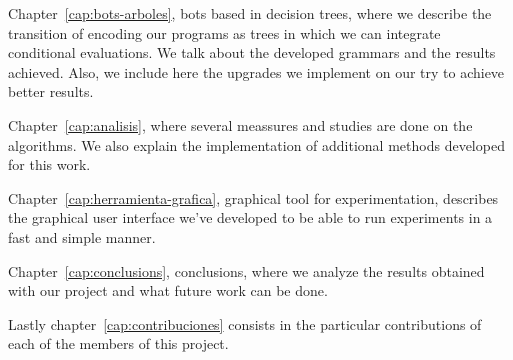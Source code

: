 Chapter~\ref{cap:bots-arboles}, bots based in decision trees, where we describe the transition of encoding our programs as trees in which we can integrate conditional evaluations. We talk about the developed grammars and the results achieved. Also, we include here the upgrades we implement on our try to achieve better results.

Chapter~\ref{cap:analisis}, where several meassures and studies are done on the algorithms. We also explain the implementation of additional methods developed for this work.

Chapter~\ref{cap:herramienta-grafica}, graphical tool for experimentation, describes the graphical user interface we’ve developed to be able to run experiments in a fast and simple manner.

Chapter~\ref{cap:conclusions}, conclusions, where we analyze the results obtained with our project and what future work can be done.

Lastly chapter~\ref{cap:contribuciones} consists in the particular contributions of each of the members of this project.
